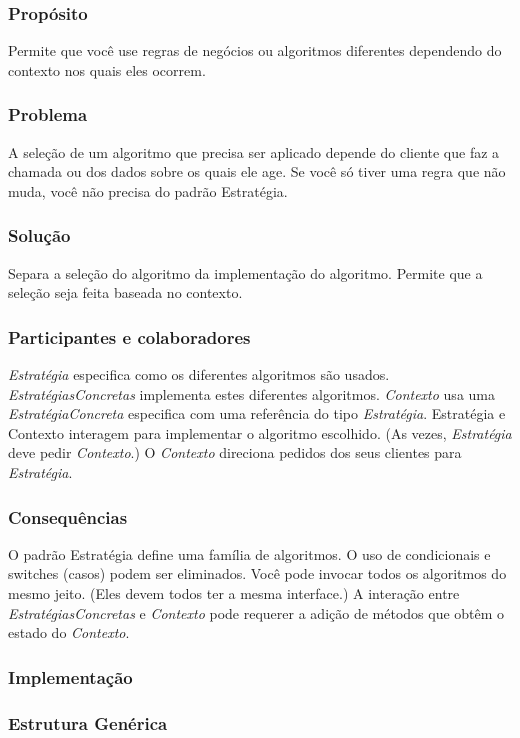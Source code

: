\documentclass[
	11pt,				%
	openright,
	twoside,			%
	a4paper,			%
	english,			%
	french,
	brazil,				%
	sumario=tradicional
	]{abntex2}
\begin{document}
\subsubsection{Propósito}
Permite que você use regras de negócios ou algoritmos diferentes dependendo do contexto nos quais eles ocorrem.

\subsubsection{Problema}
A seleção de um algoritmo que precisa ser aplicado depende do cliente que faz a chamada ou dos dados sobre os quais ele age. Se você só tiver uma regra que não muda, você não precisa do padrão Estratégia.

\subsubsection{Solução}
Separa a seleção do algoritmo da implementação do algoritmo. Permite que a seleção seja feita baseada no contexto.

\subsubsection{Participantes e colaboradores}
\emph{Estratégia} especifica como os diferentes algoritmos são usados. \emph{EstratégiasConcretas} implementa estes diferentes algoritmos. \emph{Contexto} usa uma \emph{EstratégiaConcreta} especifica com uma referência do tipo \emph{Estratégia}. Estratégia e Contexto interagem para implementar o algoritmo escolhido. (As vezes, \emph{Estratégia} deve pedir \emph{Contexto}.) O \emph{Contexto} direciona pedidos dos seus clientes para \emph{Estratégia}.

\subsubsection{Consequências}
O padrão Estratégia define uma família de algoritmos. O uso de condicionais e switches (casos) podem ser eliminados. Você pode invocar todos os algoritmos do mesmo jeito. (Eles devem todos ter a mesma interface.) A interação entre \emph{EstratégiasConcretas} e \emph{Contexto} pode requerer a adição de métodos que obtêm o estado do \emph{Contexto}.

\subsubsection{Implementação}
\subsubsection{Estrutura Genérica}
\end{document}
